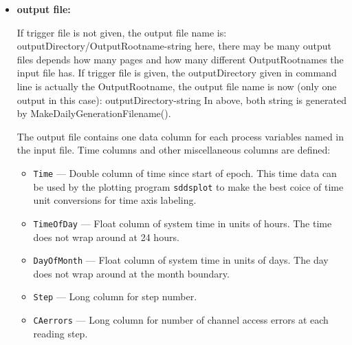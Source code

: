 \begin{itemize}
\begin{itemize}
\item {\bf output file:}\par
If trigger file is not given, the output file name is:
   outputDirectory/OutputRootname-string
   here, there may be many output files depends how many pages and how many different OutputRootnames 
   the input file has.
If trigger file is given, the outputDirectory given in command line is actually the OutputRootname,
the output file name is now (only one output in this case):
   outputDirectory-string
In above, both string is generated by MakeDailyGenerationFilename().

The output file contains one data column for each process variables named in the input file. 
Time columns and other miscellaneous columns are defined: 
\begin{itemize}
        \item {\tt Time} --- Double column of time since start of epoch. This time data can be used by
        the plotting program {\verb+sddsplot+} to make the best coice of time unit conversions
        for time axis labeling.
        \item {\tt TimeOfDay} --- Float column of system time in units of hours. 
        The time does not wrap around at 24 hours.
        \item {\tt DayOfMonth} --- Float column of system time in units of days. 
        The day does not wrap around at the month boundary.
        \item {\tt Step} --- Long column for step number.
        \item {\tt CAerrors} --- Long column for number of channel access errors at each reading step. 
\end{itemize}


\end{itemize}
\end{itemize}
